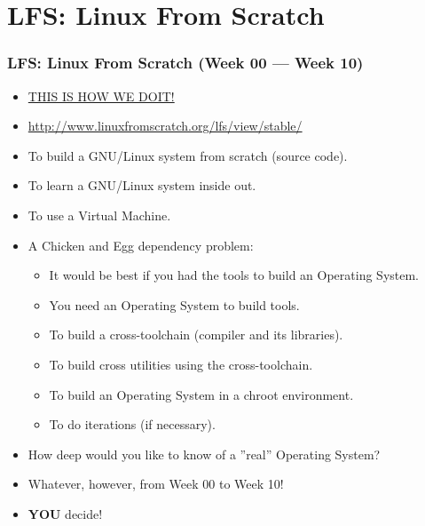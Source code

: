 \documentclass[aspectratio=169, xcolor=table, notheorems, hyperref={pdfpagelabels=false}]{beamer}
\begin{document}
\section{LFS: Linux From Scratch}
\begin{frame}
\frametitle{LFS: Linux From Scratch (Week 00 --- Week 10)}
\begin{itemize}
\item \href{https://youtu.be/jEoM3qan9Gs}{THIS IS HOW WE DOIT!}
\item \url{http://www.linuxfromscratch.org/lfs/view/stable/}
\item To build a GNU/Linux system from scratch (source code).
\item To learn a GNU/Linux system inside out.
\item To use a Virtual Machine.
\item A Chicken and Egg dependency problem:
\begin{itemize}
\item It would be best if you had the tools to build an Operating System.
\item You need an Operating System to build tools.
\item To build a cross-toolchain (compiler and its libraries).
\item To build cross utilities using the cross-toolchain.
\item To build an Operating System in a chroot environment.
\item To do iterations (if necessary).
\end{itemize}
\item How deep would you like to know of a ''real'' Operating System?
\item Whatever, however, from Week 00 to Week 10!
\item \textbf{YOU} decide!
\end{itemize}
\end{frame}

\end{document}

